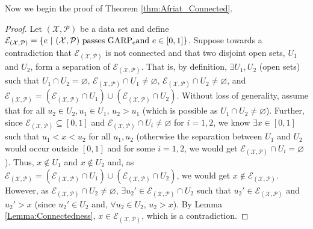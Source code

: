 \documentclass{article} %
\theoremstyle{style1}
\theoremstyle{example}
\begin{document}
Now we begin the proof of Theorem \ref{thm:Afriat_Connected}.
\begin{proof}
Let $(\mathcal{X},\mathcal{P})$ be a data set and define $\mathcal{E}_{(\mathcal{X},\mathcal{P})}=\{e\ |\ (\mathcal{X},\mathcal{P})\textrm{ passes GARP\textsubscript{e}}\\ \textrm{and } e\in[0,1]\}$. Suppose towards a contradiction that $\mathcal{E}_{(\mathcal{X},\mathcal{P})}$ is not connected and that two disjoint open sets, $U_1$ and $U_2$, form a separation of $\mathcal{E}_{(\mathcal{X},\mathcal{P})}$. That is, by definition, $\exists U_1,U_2$ (open sets) such that $U_1\cap U_2=\varnothing$, $\mathcal{E}_{(\mathcal{X},\mathcal{P})}\cap U_1\not=\varnothing$, $\mathcal{E}_{(\mathcal{X},\mathcal{P})}\cap U_2\not=\varnothing$, and $\mathcal{E}_{(\mathcal{X},\mathcal{P})}=(\mathcal{E}_{(\mathcal{X},\mathcal{P})}\cap U_1)\cup (\mathcal{E}_{(\mathcal{X},\mathcal{P})}\cap U_2)$. Without loss of generality, assume that for all $u_2\in U_2, u_1\in U_1$, $u_2>u_1$ (which is possible as $U_1\cap U_2\not=\varnothing$). Further, since $\mathcal{E}_{(\mathcal{X},\mathcal{P})}\subseteq [0,1]$ and $\mathcal{E}_{(\mathcal{X},\mathcal{P})}\cap U_i\not=\varnothing$ for $i=1,2$, we know $\exists x\in[0,1]$ such that $u_1<x<u_2$ for all $u_1,u_2$ (otherwise the separation between $U_1$ and $U_2$ would occur outside $[0,1]$ and for some $i=1,2$, we would get $\mathcal{E}_{(\mathcal{X},\mathcal{P})}\cap U_i=\varnothing$). Thus, $x\not\in U_1$ and $x\not\in U_2$ and, as $\mathcal{E}_{(\mathcal{X},\mathcal{P})}=(\mathcal{E}_{(\mathcal{X},\mathcal{P})}\cap U_1)\cup (\mathcal{E}_{(\mathcal{X},\mathcal{P})}\cap U_2)$, we would get $x\not\in\mathcal{E}_{(\mathcal{X},\mathcal{P})}$. However, as $\mathcal{E}_{(\mathcal{X},\mathcal{P})}\cap U_2\not=\varnothing$, $\exists u_2'\in \mathcal{E}_{(\mathcal{X},\mathcal{P})}\cap U_2$ such that $u_2'\in  \mathcal{E}_{(\mathcal{X},\mathcal{P})}$ and $u_2'>x$ (since $u_2'\in U_2$ and, $\forall u_2\in U_2$, $u_2>x$). By Lemma \ref{Lemma:Connectedness}, $x\in\mathcal{E}_{(\mathcal{X},\mathcal{P})}$, which is a contradiction.
\end{proof}
\end{document}
